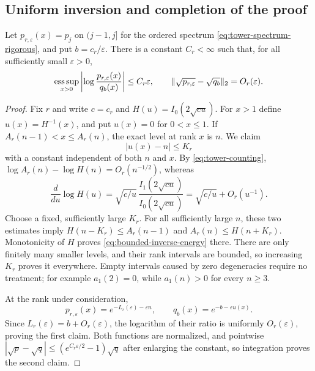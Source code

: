 \subsection{Uniform inversion and completion of the proof}

\begin{lemma}
\label{lem:tower-uniform-comparison}
Let $p_{r,\varepsilon}(x)=p_j$ on $(j-1,j]$ for the ordered spectrum
\eqref{eq:tower-spectrum-rigorous}, and put $b=c_r/\varepsilon$.
There is a constant $C_r<\infty$ such that, for all sufficiently
small $\varepsilon>0$,
\begin{equation}\label{eq:tower-uniform-logratio}
 \underset{x>0}{\operatorname{ess\,sup}}
 \left|\log\frac{p_{r,\varepsilon}(x)}{q_b(x)}\right|
 \leq C_r\varepsilon,
 \qquad
 \lVert \sqrt{p_{r,\varepsilon}}-\sqrt{q_b}\rVert_2=O_r(\varepsilon).
\end{equation}
\end{lemma}

\begin{proof}
Fix $r$ and write $c=c_r$ and $H(u)=I_0(2\sqrt{cu})$.
For $x>1$ define $u(x)=H^{-1}(x)$, and put $u(x)=0$ for
$0<x\leq1$.  If $A_r(n-1)<x\leq A_r(n)$, the exact level at rank
$x$ is $n$.  We claim
\begin{equation}\label{eq:bounded-inverse-energy}
 |u(x)-n|\leq K_r
\end{equation}
with a constant independent of both $n$ and $x$.
By \eqref{eq:tower-counting},
$\log A_r(n)-\log H(n)=O_r(n^{-1/2})$, whereas
\[
 \frac{d}{du}\log H(u)=\sqrt{c/u}\,
               \frac{I_1(2\sqrt{cu})}{I_0(2\sqrt{cu})}
             =\sqrt{c/u}+O_r(u^{-1}).
\]
Choose a fixed, sufficiently large $K_r$.  For all sufficiently large
$n$, these two estimates imply
$H(n-K_r)\leq A_r(n-1)$ and $A_r(n)\leq H(n+K_r)$.
Monotonicity of $H$ proves \eqref{eq:bounded-inverse-energy} there.
There are only finitely many smaller levels, and their rank intervals
are bounded, so increasing $K_r$ proves it everywhere.
Empty intervals caused by zero degeneracies require no treatment;
for example $a_1(2)=0$, while $a_1(n)>0$ for every $n\geq3$.

At the rank under consideration,
\[
 p_{r,\varepsilon}(x)=e^{-L_r(\varepsilon)-\varepsilon n},
 \qquad q_b(x)=e^{-b-\varepsilon u(x)}.
\]
Since $L_r(\varepsilon)=b+O_r(\varepsilon)$, the logarithm of their
ratio is uniformly $O_r(\varepsilon)$, proving the first claim.
Both functions are normalized, and pointwise
$|\sqrt p-\sqrt q|\leq(e^{C_r\varepsilon/2}-1)\sqrt q$ after
enlarging the constant, so integration proves the second claim.
\end{proof}

